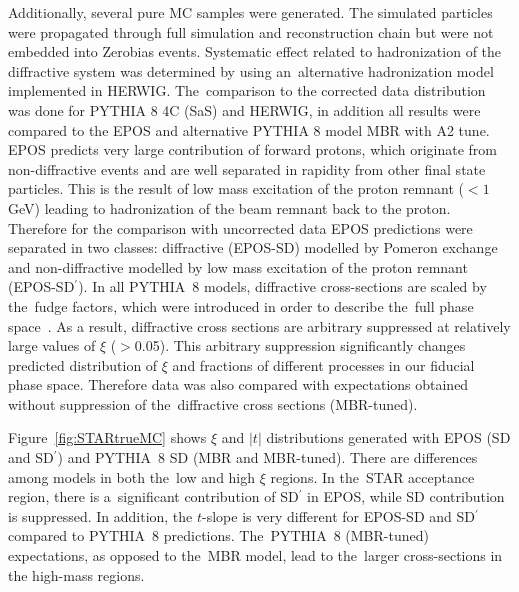 Additionally, several pure MC samples were generated. The simulated particles were propagated through full simulation and reconstruction chain but were  not embedded  into Zerobias events.   
Systematic effect related to hadronization of the diffractive system was determined by using an~alternative hadronization model implemented in HERWIG. The~comparison to the corrected data distribution was done for PYTHIA 8 4C (\ac{SaS}) and HERWIG, in addition all results were compared to the EPOS and alternative PYTHIA 8 model  \ac{MBR}  with A2 tune. EPOS predicts very large contribution of forward 
protons, which originate from non-diffractive events and are well separated in rapidity from other final state particles. This is the result of low mass excitation of the proton remnant ($<1$ GeV) leading to hadronization of the beam remnant back to the proton. Therefore for the comparison with uncorrected data EPOS predictions were separated in two classes: diffractive (EPOS-SD) modelled by Pomeron exchange and non-diffractive modelled  by low mass excitation of the proton remnant (EPOS-SD$^\prime$). In all PYTHIA~8 models, diffractive cross-sections are scaled by the~fudge factors, which were introduced in order to describe the~full phase space~\cite{Sjostrand:2006za,MBR:intro}. As a result, diffractive cross sections are arbitrary suppressed at 
relatively large values of $\xi$ ($>$0.05). This arbitrary suppression significantly changes predicted distribution of $\xi$ and fractions of different processes in our fiducial phase space. Therefore data was also compared with expectations obtained without suppression of the~diffractive cross sections (MBR-tuned).

Figure~\ref{fig:STARtrueMC} shows $\xi$ and $|t|$ distributions generated with  EPOS (SD and SD$^\prime$) and PYTHIA~8 SD (MBR and MBR-tuned). There are differences among models in both the~low and high $\xi$ regions. In the~STAR acceptance region, there is a~significant contribution of SD$^\prime$ in EPOS, while SD contribution is suppressed. In addition, the $t$-slope is  very different for EPOS-SD and SD$^\prime$ compared to PYTHIA~8 predictions. The~PYTHIA~8 (MBR-tuned) expectations, as opposed to the~MBR model,  lead
to the~larger cross-sections in the high-mass regions.
 
